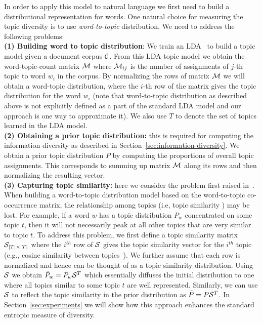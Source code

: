 \documentclass{article} %
\begin{document}
In order to apply this model to natural language we first need to build a distributional representation for words. One
natural choice for measuring the topic diversity is to use {\sl word-to-topic} distribution. We need to address the following problems:\\
{\bf (1) Building word to topic distribution}: We train an
LDA~\cite{Blei:2003:LDA:944919.944937} to build a topic model given a
document corpus ${\mathcal C}$. From this LDA topic model we obtain the
word-topic-count matrix ${\mathcal M}$ where ${\mathcal M}_{ij}$ is the number of
assignments of $j$-th topic to word $w_i$ in the corpus. By normalizing the rows of matrix ${\mathcal M}$ we will obtain
a word-topic distribution, where the $i$-th row of the matrix gives the topic distribution for the word $w_i$ (note that word-to-topic distribution as described above is not explicitly defined as a part of the standard LDA model and our approach is one way to approximate it). We also use $T$ to denote the set of topics learned in the LDA model.\\
{\bf (2) Obtaining a prior topic distribution:} this is
required for computing the information diversity as described in Section~\ref{sec:information-diversity}. We obtain a prior
 topic distribution $P$ by computing the proportions of overall topic
 assignments. This corresponds to summing up matrix ${\mathcal M}$ along its
 rows and then normalizing the resulting vector.\\
{\bf (3) Capturing topic similarity:} here we consider the problem first raised in~\cite{bache:2013}. When building a word-to-topic distribution model based on 
the word-to-topic co-occurrence matrix, the relationship among topics (i.e, topic similarity ) may be lost. For example, if a word $w$
has a topic distribution $P_w$ concentrated on some topic $t$, then it will
not necessarily peak at all other topics that are very similar to topic $t$. To address this problem, we first define a topic similarity matrix ${\mathcal S}_{|T|\times|T|}$
where the $i^{th}$ row of ${\mathcal S}$ gives the topic similarity vector for
the $i^{th}$ topic (e.g., cosine similarity between
topics~\cite{bache:2013}). We further assume that each row is normalized 
and hence can be thought of as a topic similarity distribution. Using ${\mathcal S}$ we obtain $\tilde{P}_w = P_w{\mathcal S}^T$ which essentially diffuses the initial distribution to
one where  all topics similar to some topic $t$ are well represented. Similarly, we can use ${\mathcal S}$ to reflect the topic similarity in the prior distribution as $\tilde{P} = P{\mathcal S}^T$.
In Section~\ref{sec:experiments} we will show how this
approach enhances the standard entropic measure of diversity.\\
\end{document}
